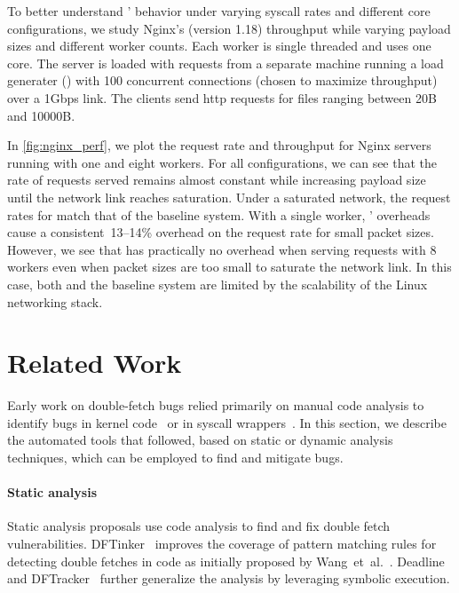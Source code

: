 \documentclass[letterpaper,twocolumn,10pt]{article}
\begin{document}
To better understand \midas' behavior under varying syscall
rates and different core configurations, we study Nginx's (version 1.18)
throughput while varying payload sizes and different worker counts.
Each worker is single threaded and uses one core.
The server is loaded with requests from a separate machine running
a load generater () with 100 concurrent
connections (chosen to maximize throughput) over a 1Gbps link.
The clients send http requests for files ranging between 20B and
10000B.

In \autoref{fig:nginx_perf}, we plot the request rate and throughput
for Nginx servers running with one and eight workers.
For all configurations, we can see that the rate of requests served
remains almost constant while increasing payload size until the network
link reaches saturation.
Under a saturated network, the request rates for \midas match that
of the baseline system.
With a single worker, \midas' overheads cause a consistent~13--14\%
overhead on the request rate for small packet sizes.
However, we see that \midas has practically no overhead when serving
requests with 8 workers even when packet sizes are too small to
saturate the network link.
In this case, both \midas and the baseline system are limited by the
scalability of the Linux networking stack.

\section{Related Work}

Early work on double-fetch bugs relied primarily on manual
code analysis to identify bugs in kernel code~\cite{YangCSS12}
or in syscall wrappers~\cite{watson2007exploiting}.
In this section, we describe the automated tools that followed,
based on static or dynamic analysis techniques, which can be employed
to find and mitigate \tocttou bugs.

\paragraph{Static analysis}
%
Static analysis proposals use code analysis to find and fix double fetch
vulnerabilities.
DFTinker~\cite{dftinker} improves the coverage of pattern matching rules
for detecting double fetches in code as initially proposed by Wang~et~al.~\cite{wang2017double}.
Deadline~\cite{deadline} and DFTracker~\cite{wang2019dftracker} further
generalize the analysis by leveraging symbolic execution.
\end{document}
